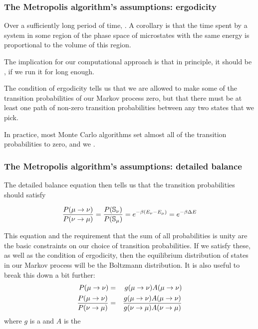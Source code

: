 \documentclass[hyperref={colorlinks=true}]{beamer}
\begin{document}
\begin{frame}%
  \frametitle{The Metropolis algorithm's assumptions: ergodicity}
  
  Over a sufficiently long period of time, . A corollary is that the time spent by a system in some region of the phase space of microstates with the same energy is proportional to the volume of this region. 

  \vspace{0.3cm}
  
  The implication for our computational approach is that in principle, it should be , if we run it for long enough. 
  
  \vspace{0.3cm}
  
  The condition of ergodicity tells us that we are allowed to make some of the transition probabilities of our Markov process zero, but that there must be at least one path of non-zero transition probabilities between any two states that we pick. 
  
  \vspace{0.3cm}
  
  In practice, most Monte Carlo algorithms set almost all of the transition probabilities to zero, and we .

\end{frame}


\begin{frame}%
  \frametitle{The Metropolis algorithm's assumptions: detailed balance}
  
  The detailed balance equation then tells us that the transition probabilities should satisfy
  
  \begin{equation}
    \frac{P(\mu \rightarrow \nu)}{P(\nu \rightarrow \mu)} = \frac{P(\mathbb{S}_{\nu})}{P(\mathbb{S}_{\mu})} = e^{- \beta (E_{\nu} - E_{\mu})} = e^{- \beta \Delta E}
  \end{equation}
  
  This equation and the requirement that the sum of all probabilities is unity are the basic constraints on our choice of transition probabilities. If we satisfy these, as well as the condition of ergodicity, then the equilibrium distribution of states in our Markov process will be the Boltzmann distribution. It is also useful to break this down a bit further:
  \begin{eqnarray}
    P(\mu \rightarrow \nu) &=& g(\mu \rightarrow \nu) A(\mu \rightarrow \nu) \\
    \frac{P(\mu \rightarrow \nu)}{P(\nu \rightarrow \mu)} &=& \frac{g(\mu \rightarrow \nu) A(\mu \rightarrow \nu)}{g(\nu \rightarrow \mu) A(\nu \rightarrow \mu)}
  \end{eqnarray}
  where $g$ is a  and $A$ is the 
\end{frame}
\end{document}
